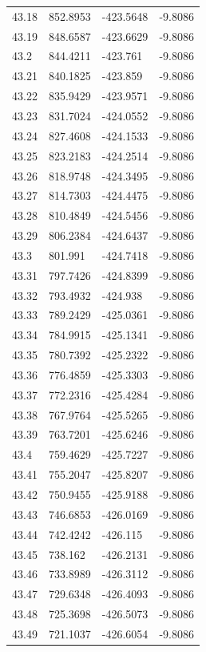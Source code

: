 \begin{table}[H]
\begin{tabular}{llll}
43.18 & 852.8953 & -423.5648 & -9.8086 \\
43.19 & 848.6587 & -423.6629 & -9.8086 \\
43.2 & 844.4211 & -423.761 & -9.8086 \\
43.21 & 840.1825 & -423.859 & -9.8086 \\
43.22 & 835.9429 & -423.9571 & -9.8086 \\
43.23 & 831.7024 & -424.0552 & -9.8086 \\
43.24 & 827.4608 & -424.1533 & -9.8086 \\
43.25 & 823.2183 & -424.2514 & -9.8086 \\
43.26 & 818.9748 & -424.3495 & -9.8086 \\
43.27 & 814.7303 & -424.4475 & -9.8086 \\
43.28 & 810.4849 & -424.5456 & -9.8086 \\
43.29 & 806.2384 & -424.6437 & -9.8086 \\
43.3 & 801.991 & -424.7418 & -9.8086 \\
43.31 & 797.7426 & -424.8399 & -9.8086 \\
43.32 & 793.4932 & -424.938 & -9.8086 \\
43.33 & 789.2429 & -425.0361 & -9.8086 \\
43.34 & 784.9915 & -425.1341 & -9.8086 \\
43.35 & 780.7392 & -425.2322 & -9.8086 \\
43.36 & 776.4859 & -425.3303 & -9.8086 \\
43.37 & 772.2316 & -425.4284 & -9.8086 \\
43.38 & 767.9764 & -425.5265 & -9.8086 \\
43.39 & 763.7201 & -425.6246 & -9.8086 \\
43.4 & 759.4629 & -425.7227 & -9.8086 \\
43.41 & 755.2047 & -425.8207 & -9.8086 \\
43.42 & 750.9455 & -425.9188 & -9.8086 \\
43.43 & 746.6853 & -426.0169 & -9.8086 \\
43.44 & 742.4242 & -426.115 & -9.8086 \\
43.45 & 738.162 & -426.2131 & -9.8086 \\
43.46 & 733.8989 & -426.3112 & -9.8086 \\
43.47 & 729.6348 & -426.4093 & -9.8086 \\
43.48 & 725.3698 & -426.5073 & -9.8086 \\
43.49 & 721.1037 & -426.6054 & -9.8086 \\

\end{tabular}
\end{table}
